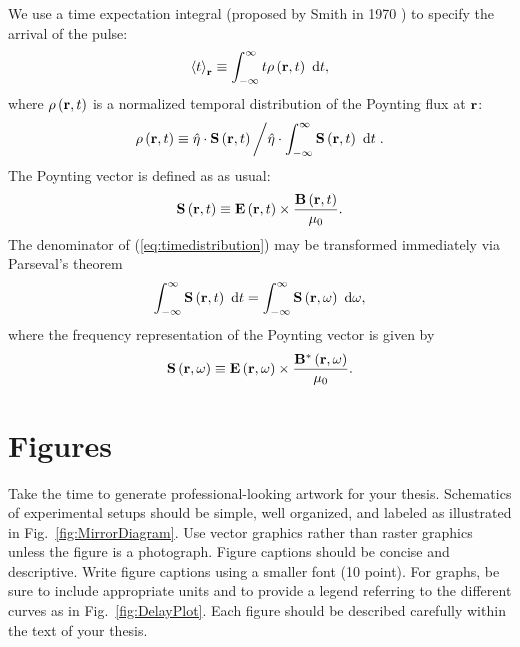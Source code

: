 We use a time expectation integral (proposed by Smith in 1970
\cite{Smith1970}) to specify the arrival of the pulse:
\begin{equation}
  {\left< t \right>}_{ {\bf r} } \equiv
  \int^{\infty}_{-\infty}{t \rho \left( {\bf r}, t \right) \textrm{
  d}t}
  \label{eq:arrival} ,
\end{equation}
where $\rho \left( {\bf r} , t \right)$ is a normalized temporal
distribution of the Poynting flux at ${\bf r}$:
\begin{equation}
  \rho \left( {\bf r}, t \right)  \equiv \hat{\eta} \cdot
  {\bf S} \left( {\bf r}, t \right)
  \left/ \hat{\eta} \cdot \int^{\infty}_{-\infty}{{\bf S}
  \left( {\bf r}, t \right) \textrm{ d}t} \right.
  \label{eq:timedistribution} .
\end{equation}
The Poynting vector is defined as as usual:
\begin{equation}
  {\bf S} \left( {\bf r},t \right) \equiv {\bf E} \left( {\bf r},t
  \right) \times \frac{{\bf B} \left( {\bf r},t
  \right)}{\mu_0} . \label{eq:poynttime}
\end{equation}
The denominator of (\ref{eq:timedistribution}) may be transformed
immediately via Parseval's theorem
\begin{equation}
  \int^\infty_{-\infty}{ {\bf S} \left( {\bf r},t \right) \textrm{ d}t
  } = \int^\infty_{-\infty}{ {\bf S} \left( {\bf r},\omega \right)
  \textrm{ d}\omega } \label{eq:parseval} ,
\end{equation}
where the frequency representation of the Poynting vector is given
by
\begin{equation}
  {\bf S} \left( {\bf r},\omega \right) \equiv {\bf E} \left( {\bf r},\omega
  \right) \times \frac{{\bf B}^* \left( {\bf r},\omega
  \right)}{\mu_0} . \label{eq:poyntfreq}
\end{equation}

\section{Figures}
\label{sec:Figures} 

Take the time to generate professional-looking artwork for your
thesis. Schematics of experimental setups should be simple, well
organized, and labeled as illustrated in
Fig.~\ref{fig:MirrorDiagram}. Use vector graphics rather than raster
graphics unless the figure is a photograph.  Figure captions should
be concise and descriptive. Write figure captions using a smaller
font (10 point). For graphs, be sure to include appropriate units
and to provide a legend referring to the different curves as in
Fig.~\ref{fig:DelayPlot}. Each figure should be described carefully
within the text of your thesis.

